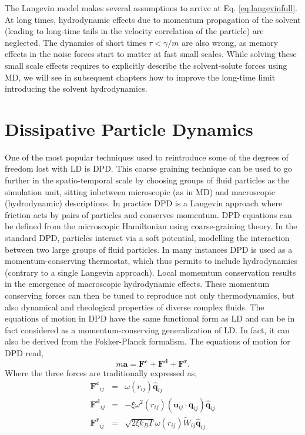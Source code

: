 \documentclass[ twoside,openright,titlepage,numbers=noenddot,%
headinclude,footinclude,cleardoublepage=empty,abstract=on,
BCOR=5mm,paper=b5,fontsize=11pt, dvipsnames
]{scrreprt}
\renewcommand{\vec}[1]{\bm{#1}}
\newcommand{\kT}{k_B T}
\newcommand{\ppos}{q}
\newcommand{\pvel}{u}
\begin{document}
The Langevin model makes several assumptions to arrive at Eq. \eqref{eq:langevinfull}. At long times, hydrodynamic effects due to momentum propagation of the solvent (leading to long-time tails in the velocity correlation of the particle) are neglected. The dynamics of short times $\tau<\gamma/m$ are also wrong, as memory effects in the noise forces start to matter at fast small scales. While solving these small scale effects requires to explicitly describe the solvent-solute forces using \gls{MD}, we will see in subsequent chapters how to improve the long-time limit introducing the solvent hydrodynamics.

\chapter{Dissipative Particle Dynamics}\label{ch:dpd}
One of the most popular techniques used to reintroduce some of the degrees of freedom lost with \gls{LD} is \gls{DPD}. This coarse graining technique can be used to go further in the spatio-temporal scale by choosing groups of fluid particles as the simulation unit, sitting inbetween microscopic (as in \gls{MD}) and macroscopic (hydrodynamic) descriptions. In practice \gls{DPD} is a Langevin approach where friction acts by pairs of particles and conserves momentum. \gls{DPD} equations can be defined from the microscopic Hamiltonian using coarse-graining theory\cite{Hijon2010}.
In the standard \gls{DPD}, particles interact via a soft potential, modelling the interaction between two large groups of fluid particles.
In many instances\cite{Sablic2007} \gls{DPD} is used as a momentum-conserving thermostat, which thus permits to include hydrodynamics (contrary to a single Langevin approach). Local momemtum conservation results in the emergence of macroscopic hydrodynamic effects. These momentum conserving forces can then be tuned to reproduce not only thermodynamics, but also dynamical and rheological properties of diverse complex fluids.
The equations of motion in \gls{DPD} have the same functional form as \gls{LD} and can be in fact considered as a momentum-conserving generalization of \gls{LD}. In fact, it can also be derived from the Fokker-Planck formalism\cite{dunweg1991}. The equations of motion for \gls{DPD} read,
\begin{equation}
  \label{eq:dpddyn}
  m\vec{a} = \vec{F^c} + \vec{F^d} + \vec{F^r}.
\end{equation}
Where the three forces are traditionally expressed as\cite{Groot1997,Espanol1995},
\begin{equation}
  \label{eq:dpdforces}
  \begin{aligned}
    \vec{F^c}_{ij} &=&\omega(r_{ij})\hat{\vec{\ppos}}_{ij}\\
    \vec{F^d}_{ij} &=&-\xi\omega^2(r_{ij})(\vec{\pvel}_{ij}\cdot\vec{\ppos}_{ij})\hat{\vec{\ppos}}_{ij}\\
    \vec{F^r}_{ij} &=&\sqrt{2\xi\kT}\omega(r_{ij})\widetilde{W}_{ij}\hat{\vec{\ppos}}_{ij}    
  \end{aligned}
\end{equation}
\end{document}
